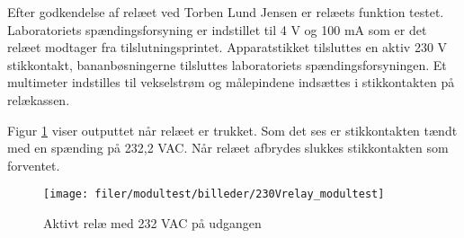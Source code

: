 
Efter godkendelse af relæet ved Torben Lund Jensen er relæets funktion testet. 
Laboratoriets spændingsforsyning er indstillet til 4 V og 100 mA som er det relæet modtager fra tilslutningsprintet.
Apparatstikket tilsluttes en aktiv 230 V stikkontakt, bananbøsningerne tilsluttes laboratoriets spændingsforsyningen.
Et multimeter indstilles til vekselstrøm og målepindene indsættes i stikkontakten på relækassen.


Figur \ref{lab:Relay_moduletest} viser outputtet når relæet er trukket. Som det ses er stikkontakten tændt med en spænding på 232,2 VAC. Når relæet afbrydes slukkes stikkontakten som forventet.

\begin{figure}[htb]
\centering
{\texttt{[image: filer/modultest/billeder/230Vrelay\_modultest]}}
\caption{Aktivt relæ med 232 VAC på udgangen }
\label{lab:Relay_moduletest}
\end{figure}


